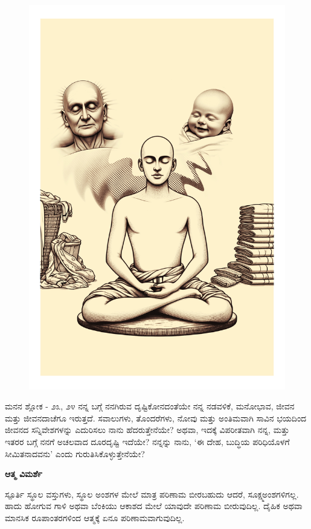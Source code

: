 \thispagestyle{empty}
\begin{figure}
\centering
\includegraphics[width=\paperwidth, height=\paperheight, keepaspectratio]{../images/002.jpg}
\end{figure}
\restoregeometry %
\newpage

\begin{mananam}{\mananamfont \large{ಮನನ ಶ್ಲೋಕ - ೨೩, ೨೪}}
\footnotesize \mananamtext ನನ್ನ ಬಗ್ಗೆ ನನಗಿರುವ ದೃಷ್ಟಿಕೋನದಂತೆಯೇ ನನ್ನ ನಡವಳಿಕೆ, ಮನೋಭಾವ, ಜೀವನ ಮತ್ತು ಜೀವನದಾಚೆಗೂ  ಇರುತ್ತದೆ. ಸವಾಲುಗಳು, ತೊಂದರೆಗಳು, ನೋವು ಮತ್ತು ಅಂತಿಮವಾಗಿ ಸಾವಿನ ಭಯದಿಂದ ಜೀವನದ ಸನ್ನಿವೇಶಗಳನ್ನು ಎದುರಿಸಲು ನಾನು ಹೆದರುತ್ತೇನೆಯೇ? ಅಥವಾ, ಇದಕ್ಕೆ ವಿಪರೀತವಾಗಿ ನನ್ನ, ಮತ್ತು ಇತರರ ಬಗ್ಗೆ ನನಗೆ ಅಚಲವಾದ ದೂರದೃಷ್ಟಿ ಇದೆಯೇ?  ನನ್ನನ್ನು ನಾನು, ‘ಈ ದೇಹ, ಬುದ್ಧಿಯ ಪರಿಧಿಯೊಳಗೆ ಸೀಮಿತನಾದವನು’ ಎಂದು ಗುರುತಿಸಿಕೊಳ್ಳುತ್ತೇನೆಯೇ? 
\end{mananam}
\WritingHand\enspace\textbf{ಆತ್ಮ ವಿಮರ್ಶೆ}
\begin{inspiration}{\mananamfont \large ಸ್ಪೂರ್ತಿ}
\footnotesize \mananamtext ಸ್ಥೂಲ ವಸ್ತುಗಳು, ಸ್ಥೂಲ ಅಂಶಗಳ ಮೇಲೆ ಮಾತ್ರ ಪರಿಣಾಮ ಬೀರಬಹುದು ಆದರೆ, ಸೂಕ್ಷ್ಮಅಂಶಗಳಿಗಲ್ಲ. ಹಾದು ಹೋಗುವ ಗಾಳಿ ಅಥವಾ ಬೆಂಕಿಯು ಆಕಾಶದ ಮೇಲೆ ಯಾವುದೇ ಪರಿಣಾಮ ಬೀರುವುದಿಲ್ಲ. ದೈಹಿಕ ಅಥವಾ ಮಾನಸಿಕ ರೂಪಾಂತರಗಳಿಂದ ಆತ್ಮಕ್ಕೆ ಏನೂ ಪರಿಣಾಮವಾಗುವುದಿಲ್ಲ.
\end{inspiration}
\newpage

